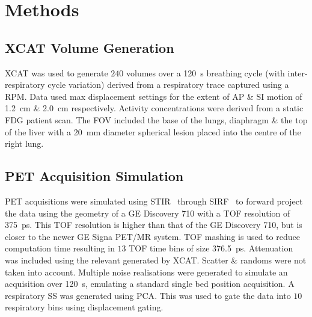\section{Methods} \label{sec:methods}
    \subsection{XCAT Volume Generation} \label{sec:xcat_volume_generation}
        \gls{XCAT}%
        was used to generate $240$ volumes over a \SI{120}{\second} breathing cycle (with inter-respiratory cycle variation) derived from a respiratory trace captured using a \gls{RPM}. Data used max displacement settings for the extent of \gls{AP} \& \gls{SI} motion of \SI{1.2}{\centi\metre} \& \SI{2.0}{\centi\metre} respectively. Activity concentrations were derived from a static \gls{FDG} patient scan. The \gls{FOV} included the base of the lungs, diaphragm \& the top of the liver with a \SI{20}{\milli\metre} diameter spherical lesion placed into the centre of the right lung.
    
    \subsection{PET Acquisition Simulation} \label{sec:pet_acquisition_simulation}
        \gls{PET} acquisitions were simulated %
        using \gls{STIR}~\cite{Thielemans2012, Efthimiou2018} through \gls{SIRF}~\cite{ Ovtchinnikov2019CCPPETMRSIRF} to forward project the data using the geometry of a \gls{GE} Discovery 710 with a \gls{TOF} resolution of \SI{375}{\pico\second}. This \gls{TOF} resolution is higher than that of the \gls{GE} Discovery 710, but is closer to the newer \gls{GE} Signa \gls{PET}/\gls{MR} system. \gls{TOF} mashing is used to reduce computation time resulting in $13$ \gls{TOF} time bins of size \SI{376.5}{\pico\second}. Attenuation was included%
        using the relevant  generated by \gls{XCAT}. Scatter \& randoms were not taken into account. Multiple noise realisations were generated to simulate an acquisition over \SI{120}{\second}, emulating a standard single bed position acquisition. A respiratory \gls{SS} was generated using \gls{PCA}.%
        This was used to gate the data into $10$ respiratory bins using displacement gating.%
    
